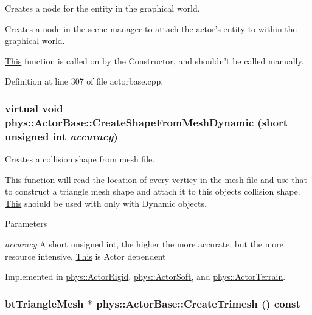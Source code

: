 Creates a node for the entity in the graphical world. 

Creates a node in the scene manager to attach the actor's entity to within the graphical world. \par
 \hyperlink{structThis}{This} function is called on by the Constructor, and shouldn't be called manually. 

Definition at line 307 of file actorbase.cpp.

\hypertarget{classphys_1_1ActorBase_aa41370f6d2031a9dad8df45bd7f3bcc6}{
\subsubsection[{CreateShapeFromMeshDynamic}]{\setlength{\rightskip}{0pt plus 5cm}virtual void phys::ActorBase::CreateShapeFromMeshDynamic (short unsigned int {\em accuracy})}}
\label{d8/d0f/classphys_1_1ActorBase_aa41370f6d2031a9dad8df45bd7f3bcc6}


Creates a collision shape from mesh file. 

\hyperlink{structThis}{This} function will read the location of every verticy in the mesh file and use that to construct a triangle mesh shape and attach it to this objects collision shape. \hyperlink{structThis}{This} shoiuld be used with only with Dynamic objects. 
\begin{DoxyParams}{Parameters}
\item[{\em accuracy}]A short unsigned int, the higher the more accurate, but the more resource intensive. \hyperlink{structThis}{This} is Actor dependent \end{DoxyParams}


Implemented in \hyperlink{classphys_1_1ActorRigid_aab4a408ce0724be6adf4c9f51f55f8a1}{phys::ActorRigid}, \hyperlink{classphys_1_1ActorSoft_aaa8bb89969831c8bc727d7aba230d862}{phys::ActorSoft}, and \hyperlink{classphys_1_1ActorTerrain_aa5f545a73da45ab219121c4b2cd0ded9}{phys::ActorTerrain}.

\hypertarget{classphys_1_1ActorBase_af869b78fcac01ee153d495953daab382}{
\subsubsection[{CreateTrimesh}]{\setlength{\rightskip}{0pt plus 5cm}btTriangleMesh $\ast$ phys::ActorBase::CreateTrimesh () const}}
\label{d8/d0f/classphys_1_1ActorBase_af869b78fcac01ee153d495953daab382}


